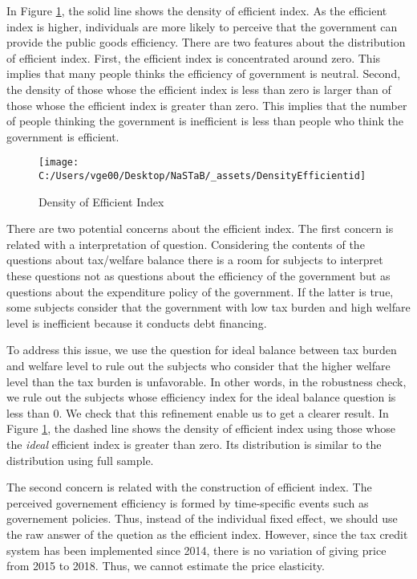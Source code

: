 \documentclass[ review  , 3p ]{elsarticle}
\begin{document}
  In Figure \ref{fig:showDensityEfficientIndex}, the solid line shows the density of efficient index.
  As the efficient index is higher,
  individuals are more likely to perceive that the government can provide the public goods efficiency.
  There are two features about the distribution of efficient index.
  First, the efficient index is concentrated around zero.
  This implies that many people thinks the efficiency of government is neutral.
  Second, the density of those whose the efficient index is less than zero is larger than of
  those whose the efficient index is greater than zero.
  This implies that the number of people thinking the government is inefficient is
  less than people who think the government is efficient.

  \begin{figure}[t]

  {\centering \texttt{[image: C:/Users/vge00/Desktop/NaSTaB/\_assets/DensityEfficientid]} 

  }

  \caption{Density of Efficient Index}\label{fig:showDensityEfficientIndex}
  \end{figure}

  There are two potential concerns about the efficient index.
  The first concern is related with a interpretation of question.
  Considering the contents of the questions about tax/welfare balance
  there is a room for subjects to interpret these questions
  not as questions about the efficiency of the government
  but as questions about the expenditure policy of the government.
  If the latter is true,
  some subjects consider that the government with low tax burden and high welfare level is inefficient because
  it conducts debt financing.

  To address this issue,
  we use the question for ideal balance between tax burden and welfare level
  to rule out the subjects who consider that the higher welfare level than the tax burden is unfavorable.
  In other words, in the robustness check,
  we rule out the subjects whose efficiency index for the ideal balance question is less than 0.
  We check that this refinement enable us to get a clearer result.
  In Figure \ref{fig:showDensityEfficientIndex},
  the dashed line shows the density of efficient index
  using those whose the \emph{ideal} efficient index is greater than zero.
  Its distribution is similar to the distribution using full sample.

  The second concern is related with the construction of efficient index.
  The perceived governement efficiency is formed by time-specific events such as governement policies.
  Thus, instead of the individual fixed effect,
  we should use the raw answer of the quetion as the efficient index.
  However, since the tax credit system has been implemented since 2014,
  there is no variation of giving price from 2015 to 2018.
  Thus, we cannot estimate the price elasticity.
\end{document}
